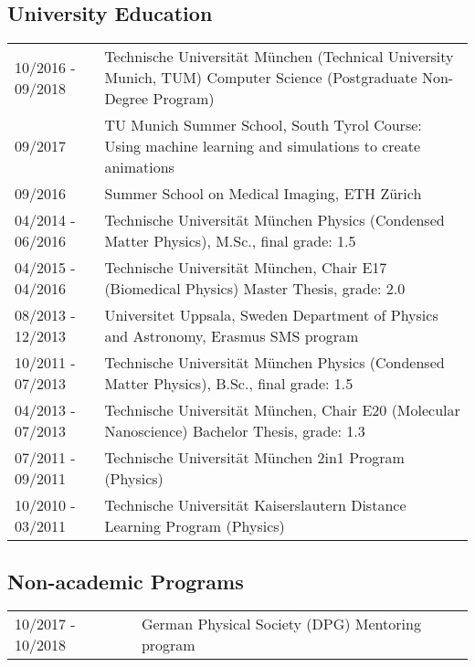 \documentclass[a4paper,10pt]{memoir}
\begin{document}
\subsection*{University Education}
\vspace*{-\baselineskip}
\begin{longtable}{@{}p{} p{}}
  10/2016 - 09/2018 &
  Technische Universität München (Technical University Munich, TUM) \newline
  Computer Science (Postgraduate Non-Degree Program)
  \\
  09/2017 &
  TU Munich Summer School, South Tyrol \newline
  Course: Using machine learning and simulations to create animations
  \\
  09/2016 &
  Summer School on Medical Imaging, ETH Zürich
  \\
  04/2014 - 06/2016 &
  Technische Universität München \newline
  Physics (Condensed Matter Physics), M.Sc., final grade: 1.5
  \\
  04/2015 - 04/2016 &
  Technische Universität München, Chair E17 (Biomedical Physics) \newline
  Master Thesis, grade: 2.0
  \\
  08/2013 - 12/2013 &
  Universitet Uppsala, Sweden \newline
  Department of Physics and Astronomy, Erasmus SMS program
  \\
  10/2011 - 07/2013 &
  Technische Universität München \newline
  Physics (Condensed Matter Physics), B.Sc., final grade: 1.5
  \\
  04/2013 - 07/2013 &
  Technische Universität München, Chair E20 (Molecular Nanoscience) \newline
  Bachelor Thesis, grade: 1.3
  \\
  07/2011 - 09/2011 &
  Technische Universität München \newline
  2in1 Program (Physics)
  \\
  10/2010 - 03/2011 &
  Technische Universität Kaiserslautern \newline
  Distance Learning Program (Physics)
\end{longtable}

\subsection*{Non-academic Programs}
\vspace*{-\baselineskip}
\begin{longtable}{@{}p{} p{}}
  10/2017 - 10/2018 &
  German Physical Society (DPG) \newline
  Mentoring program
\end{longtable}
\end{document}
